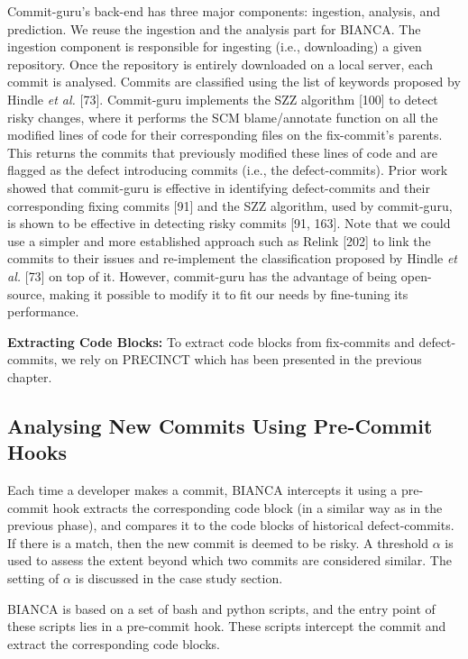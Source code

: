 \documentclass[12pt]{report}
\begin{document}
Commit-guru's back-end has three major components: ingestion, analysis,
and prediction. We reuse the ingestion and the analysis part for BIANCA.
The ingestion component is responsible for ingesting (i.e., downloading)
a given repository. Once the repository is entirely downloaded on a
local server, each commit is analysed. Commits are classified using the
list of keywords proposed by Hindle \emph{et al.} {[}73{]}. Commit-guru
implements the SZZ algorithm {[}100{]} to detect risky changes, where it
performs the SCM blame/annotate function on all the modified lines of
code for their corresponding files on the fix-commit's parents. This
returns the commits that previously modified these lines of code and are
flagged as the defect introducing commits (i.e., the defect-commits).
Prior work showed that commit-guru is effective in identifying
defect-commits and their corresponding fixing commits {[}91{]} and the
SZZ algorithm, used by commit-guru, is shown to be effective in
detecting risky commits {[}91, 163{]}. Note that we could use a simpler
and more established approach such as Relink {[}202{]} to link the
commits to their issues and re-implement the classification proposed by
Hindle \emph{et al.} {[}73{]} on top of it. However, commit-guru has the
advantage of being open-source, making it possible to modify it to fit
our needs by fine-tuning its performance.

\textbf{Extracting Code Blocks:} To extract code blocks from fix-commits
and defect-commits, we rely on PRECINCT which has been presented in the
previous chapter.

\subsection{Analysing New Commits Using Pre-Commit
Hooks}\label{sec:online}

Each time a developer makes a commit, BIANCA intercepts it using a
pre-commit hook extracts the corresponding code block (in a similar way
as in the previous phase), and compares it to the code blocks of
historical defect-commits. If there is a match, then the new commit is
deemed to be risky. A threshold \(\alpha\) is used to assess the extent
beyond which two commits are considered similar. The setting of
\(\alpha\) is discussed in the case study section.

BIANCA is based on a set of bash and python scripts, and the entry point
of these scripts lies in a pre-commit hook. These scripts intercept the
commit and extract the corresponding code blocks.
\end{document}
